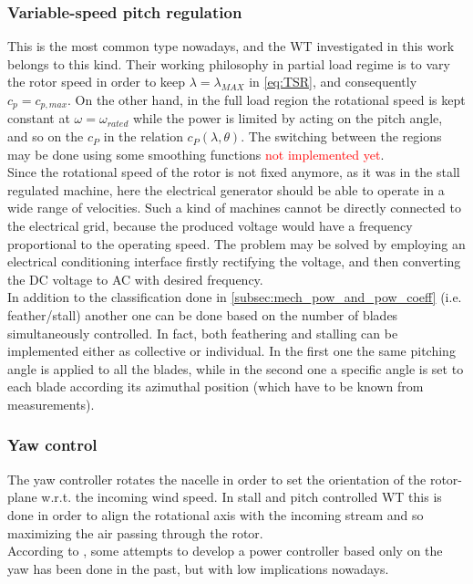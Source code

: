 \subsubsection{Variable-speed pitch regulation}
This is the most common type nowadays, and the \acrshort{WT} investigated in this work belongs to this kind. Their working philosophy in partial load regime is to vary the rotor speed in order to keep $\lambda = \lambda_{MAX}$ in \autoref{eq:TSR}, and consequently $c_p=c_{p,max}$. On the other hand, in the full load region the rotational speed is kept constant at $\omega = \omega_{rated}$ while the power is limited by acting on the pitch angle, and so on the $c_P$ in the relation $c_P(\lambda, \theta)$. The switching between the regions may be done using some smoothing functions \textcolor{red}{not implemented yet}. \\
Since the rotational speed of the rotor is not fixed anymore, as it was in the stall regulated machine, here the electrical generator should be able to operate in a wide range of velocities. Such a kind of machines cannot be directly connected to the electrical grid, because the produced voltage would have a frequency proportional to the operating speed. The problem may be solved by employing an electrical conditioning interface firstly rectifying the voltage, and then converting the DC voltage to AC with desired frequency. \\
In addition to the classification done in \autoref{subsec:mech_pow_and_pow_coeff} (i.e. feather/stall) another one can be done based on the number of blades simultaneously controlled. In fact, both feathering and stalling can be implemented either as collective or individual. In the first one the same pitching angle is applied to all the blades, while in the second one a specific angle is set to each blade according its azimuthal position (which have to be known from measurements).

\subsubsection{Yaw control}
The yaw controller rotates the nacelle in order to set the orientation of the rotor-plane w.r.t. the incoming wind speed. In stall and pitch controlled \acrshort{WT} this is done in order to align the rotational axis with the incoming stream and so maximizing the air passing through the rotor. \\
According to \cite{Aerodynamics_of_wind_turbines}, some attempts to develop a power controller based only on the yaw has been done in the past, but with low implications nowadays. 

